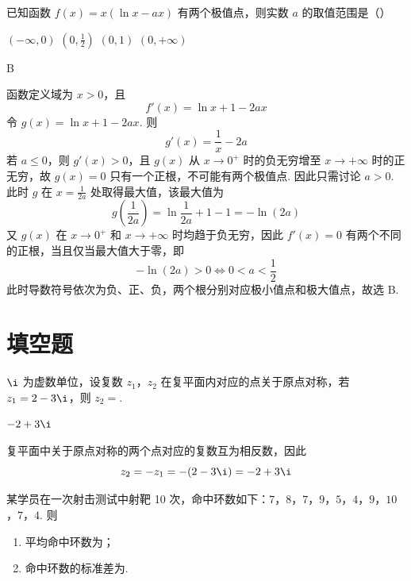 \begin{problem}
已知函数 \( f(x) = x (\ln x - ax) \) 有两个极值点，则实数 \( a \) 的取值范围是（\quad）

\choices
    {\( (-\infty,0) \)}
    {\( \left(0,\frac{1}{2}\right) \)}
    {\( (0,1) \)}
    {\( (0,+\infty) \)}
\end{problem}

\begin{answer}
B
\end{answer}

\begin{solution}
函数定义域为 \(x>0\)，且
\[
 f'(x)=\ln x+1-2ax
\]
令 \(g(x)=\ln x+1-2ax\). 则
\[
 g'(x)=\frac1x-2a
\]
若 \(a\leqslant0\)，则 \(g'(x)>0\)，且 \(g(x)\) 从 \(x\to0^+\) 时的负无穷增至 \(x\to+\infty\) 时的正无穷，故 \(g(x)=0\) 只有一个正根，不可能有两个极值点. 因此只需讨论 \(a>0\). 此时 \(g\) 在 \(x=\frac1{2a}\) 处取得最大值，该最大值为
\[
 g\left(\frac1{2a}\right)=\ln\frac1{2a}+1-1=-\ln(2a)
\]
又 \(g(x)\) 在 \(x\to0^+\) 和 \(x\to+\infty\) 时均趋于负无穷，因此 \(f'(x)=0\) 有两个不同的正根，当且仅当最大值大于零，即
\[
 -\ln(2a)>0\iff 0<a<\frac12
\]
此时导数符号依次为负、正、负，两个根分别对应极小值点和极大值点，故选 B.
\end{solution}

\section{填空题}

\begin{problem}
\(\i\) 为虚数单位，设复数 \(z_1\)，\(z_2\) 在复平面内对应的点关于原点对称，若 \(z_1=2-3\i\)，则 \(z_2=\)\fillinblank{}.
\end{problem}

\begin{answer}
\(-2+3\i\)
\end{answer}

\begin{solution}
复平面中关于原点对称的两个点对应的复数互为相反数，因此
\[
 z_2=-z_1=-(2-3\i)=-2+3\i
\]
\end{solution}

\begin{problem}
某学员在一次射击测试中射靶 10 次，命中环数如下：\(7\)，\(8\)，\(7\)，\(9\)，\(5\)，\(4\)，\(9\)，\(10\)，\(7\)，\(4\).
则
\begin{enumerate}
\item 平均命中环数为\fillinblank{}；
\item 命中环数的标准差为\fillinblank{}.
\end{enumerate}
\end{problem}


